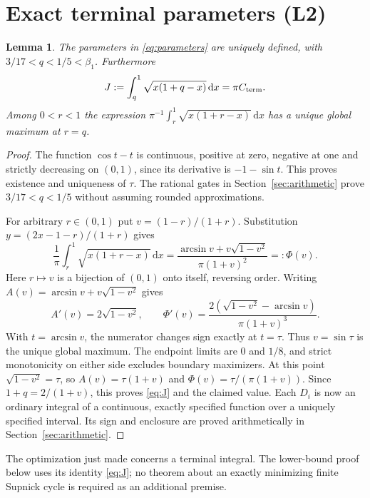 \documentclass[11pt,a4paper]{article}
\newtheorem{lemma}[theorem]{Lemma}
\theoremstyle{remark}\newtheorem{remark}[theorem]{Remark}
\newcommand{\Cterm}{C_{\rm term}}
\newcommand{\dd}{\,\mathrm d}
\begin{document}
\section{Exact terminal parameters (L2)}\label{sec:terminal}
\begin{lemma}\label{lem:terminal}
The parameters in \eqref{eq:parameters} are uniquely defined, with
$3/17<q<1/5<\beta_1$. Furthermore
\begin{equation}\label{eq:J}
J:=\int_q^1\sqrt{x(1+q-x)}\dd x=\pi\Cterm.
\end{equation}
Among $0<r<1$ the expression
$\pi^{-1}\int_r^1\sqrt{x(1+r-x)}\dd x$ has a unique global maximum
at $r=q$.
\end{lemma}
\begin{proof}
The function $\cos t-t$ is continuous, positive at zero, negative at one
and strictly decreasing on $(0,1)$, since its derivative is $-1-\sin t$.
This proves existence and uniqueness of $\tau$. The rational gates in
Section~\ref{sec:arithmetic} prove $3/17<q<1/5$ without assuming rounded
approximations.

For arbitrary $r\in(0,1)$ put $v=(1-r)/(1+r)$. Substitution
$y=(2x-1-r)/(1+r)$ gives
\[
\frac1\pi\int_r^1\sqrt{x(1+r-x)}\dd x
=\frac{\arcsin v+v\sqrt{1-v^2}}{\pi(1+v)^2}=:\Phi(v).
\]
Here $r\mapsto v$ is a bijection of $(0,1)$ onto itself, reversing order.
Writing $A(v)=\arcsin v+v\sqrt{1-v^2}$ gives
\[
A'(v)=2\sqrt{1-v^2},\qquad
\Phi'(v)=\frac{2(\sqrt{1-v^2}-\arcsin v)}{\pi(1+v)^3}.
\]
With $t=\arcsin v$, the numerator changes sign exactly at $t=\tau$.
Thus $v=\sin\tau$ is the unique global maximum. The endpoint limits
are $0$ and $1/8$, and strict monotonicity on either side excludes
boundary maximizers. At this point $\sqrt{1-v^2}=\tau$, so
$A(v)=\tau(1+v)$ and $\Phi(v)=\tau/(\pi(1+v))$.
Since $1+q=2/(1+v)$, this proves \eqref{eq:J} and the claimed value.
Each $D_i$ is now an ordinary integral of a continuous, exactly specified
function over a uniquely specified interval. Its sign and enclosure are
proved arithmetically in Section~\ref{sec:arithmetic}.
\end{proof}
The optimization just made concerns a terminal integral. The lower-bound
proof below uses its identity \eqref{eq:J}; no theorem about an exactly
minimizing finite Supnick cycle is required as an additional premise.
\end{document}
